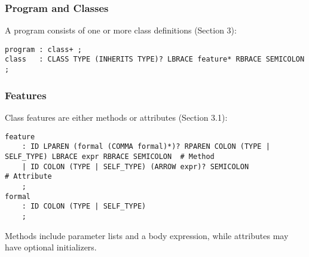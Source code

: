 \documentclass[11pt, titlepage]{article}
\begin{document}
\subsubsection{Program and Classes}
A program consists of one or more class definitions (Section 3):
\begin{lstlisting}
program : class+ ;
class   : CLASS TYPE (INHERITS TYPE)? LBRACE feature* RBRACE SEMICOLON ;
\end{lstlisting}

\subsubsection{Features}
Class features are either methods or attributes (Section 3.1):
\begin{lstlisting}
feature
    : ID LPAREN (formal (COMMA formal)*)? RPAREN COLON (TYPE | SELF_TYPE) LBRACE expr RBRACE SEMICOLON  # Method
    | ID COLON (TYPE | SELF_TYPE) (ARROW expr)? SEMICOLON                                               # Attribute
    ;
formal
    : ID COLON (TYPE | SELF_TYPE)
    ;
\end{lstlisting}
Methods include parameter lists and a body expression, while attributes may have optional initializers.
\end{document}
